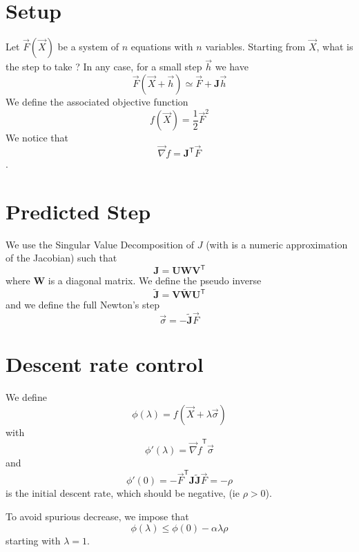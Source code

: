 \documentclass[aps,twocolumn]{revtex4}
\newcommand{\mymat}[1]{\boldsymbol{#1}}
\newcommand{\mytrn}[1]{{#1}^{\mathsf{T}}}
\newcommand{\mygrad}{\vec{\nabla}}
\begin{document}
\section{Setup}
Let $\vec{F}\left(\vec{X}\right)$ be a system of $n$ equations with $n$ variables.
Starting from $\vec{X}$, what is the step to take ?
In any case, for a small step $\vec{h}$ we have
\begin{equation}
	\vec{F}\left(\vec{X}+\vec{h}\right) \simeq \vec{F} + \mymat{J} \vec{h}
\end{equation}
We define the associated objective function
\begin{equation}
	f\left(\vec{X}\right) = \frac{1}{2} \vec{F}^2
\end{equation}
We notice that
\begin{equation}
	\mygrad f = \mytrn{\mymat{J}}\vec{F}
\end{equation}.

\section{Predicted Step}
We use the Singular Value Decomposition of $J$ (with is a numeric approximation of the Jacobian)
such that
\begin{equation}
	\mymat{J} = \mymat{U} \mymat{W} \mytrn{\mymat{V}}
\end{equation}
where $\mymat{W}$ is a diagonal matrix.
We define the pseudo inverse
\begin{equation}
	\tilde{\mymat{J}}= \mymat{V} \tilde{\mymat{W}} \mytrn{\mymat{U}}
\end{equation}
and we define the full Newton's step 
\begin{equation}
	\vec{\sigma} = -\tilde{\mymat{J}} \vec{F}
\end{equation}

\section{Descent rate control}
We define
\begin{equation}
	\phi\left(\lambda\right) = f\left(\vec{X}+\lambda\vec{\sigma}\right)
\end{equation}
with
\begin{equation}
	\phi'\left(\lambda\right) = \mytrn{\mygrad f } \vec{\sigma}
\end{equation}
and
\begin{equation}
	\phi'\left(0\right)  = - \mytrn{\vec{F}} \mymat{J} \tilde{\mymat{J}} \vec{F} = -\rho
\end{equation}
is the initial descent rate, which should be negative, (ie $\rho>0$).

To avoid spurious decrease, we impose that 
\begin{equation}
	\phi\left(\lambda\right) \leq \phi\left(0\right) - \alpha \lambda \rho
\end{equation}
starting with $\lambda=1$.
\end{document}
